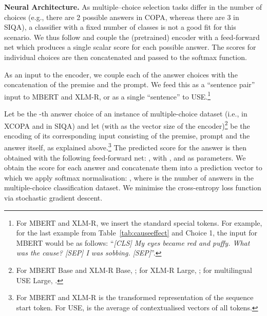 \documentclass[11pt,a4paper]{article}
\begin{document}
\vspace{1.4mm}
\noindent \textbf{Neural Architecture.} 
As multiple--choice selection tasks differ in the number of choices (e.g., there are 2 possible answers in COPA, whereas there are 3 in SIQA), a classifier with a fixed number of classes is not a good fit for this scenario. We thus follow \citet{Sap:2019siqa} and couple the (pretrained) encoder with a feed-forward net which produces a single scalar score for each possible answer. The scores for individual choices are then concatenated and passed to the softmax function. 

As an input to the encoder, we couple each of the answer choices with the concatenation of the premise and the prompt. We feed this as a ``sentence pair'' input to MBERT and XLM-R, or as a single ``sentence'' to USE.\footnote{For MBERT and XLM-R, we insert the standard special tokens. For example, for the last example from Table~\ref{tab:causeeffect} and Choice 1, the input for MBERT would be as follows: ``\textit{[CLS] My eyes became red and puffy. What was the cause? [SEP] I was sobbing. [SEP]}''.} 

Let  be the -th answer choice of an instance of multiple-choice dataset (i.e.,  in XCOPA and  in SIQA) and let  (with  as the vector size of the encoder)\footnote{For MBERT Base and XLM-R Base, ; for XLM-R Large, ; for multilingual USE Large, .} be the encoding of its corresponding input consisting of the premise, prompt and the answer itself, as explained above.\footnote{For MBERT and XLM-R  is the transformed representation of the sequence start token. For USE,  is the average of contextualised vectors of all tokens.} The predicted score  for the answer  is then obtained with the following feed-forward net: ,
with ,  and  as parameters. We obtain the score  for each answer  and concatenate them into a prediction vector to which we apply softmax normalisation: , where  is the number of answers in the multiple-choice classification dataset. We minimise the cross-entropy loss function via stochastic gradient descent.  
\end{document}
